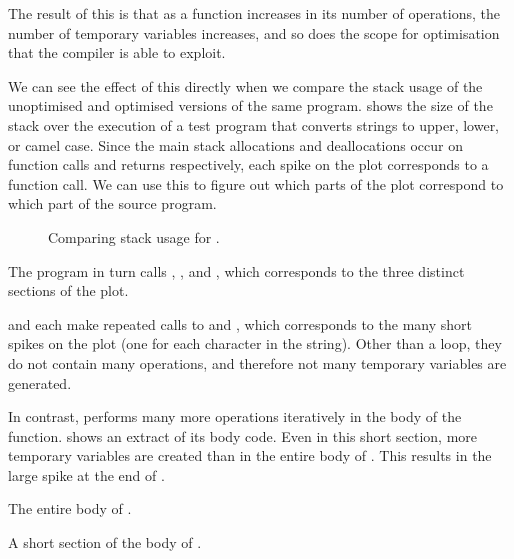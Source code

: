 \documentclass[00-main.tex]{subfiles}
\begin{document}
The result of this is that as a function increases in its number of operations, the number of temporary variables increases, and so does the scope for optimisation that the compiler is able to exploit.

We can see the effect of this directly when we compare the stack usage of the unoptimised and optimised versions of the same program.
 shows the size of the stack over the execution of a test program that converts strings to upper, lower, or camel case.
Since the main stack allocations and deallocations occur on function calls and returns respectively, each spike on the plot corresponds to a function call. We can use this to figure out which parts of the plot correspond to which part of the source program.

\begin{figure}[t]
  \centering
  \caption{Comparing stack usage for .}
  \label{fig:comparing stack usage for case.c} %
\end{figure}

The program in turn calls , , and , which corresponds to the three distinct sections of the plot.

 and  each make repeated calls to  and , which corresponds to the many short spikes on the plot (one for each character in the string).
Other than a  loop, they do not contain many operations, and therefore not many temporary variables are generated.


In contrast,  performs many more operations iteratively in the body of the function.
 shows an extract of its body code.
Even in this short section, more temporary variables are created than in the entire body of .
This results in the large spike at the end of .

\begin{listing}[t]
  \caption{The entire body of .}
  \label{lst:caseupper body code}
\end{listing}

\begin{listing}[t]
  \caption{A short section of the body of .}
  \label{lst:section of casecamel body code}
\end{listing}
\end{document}
